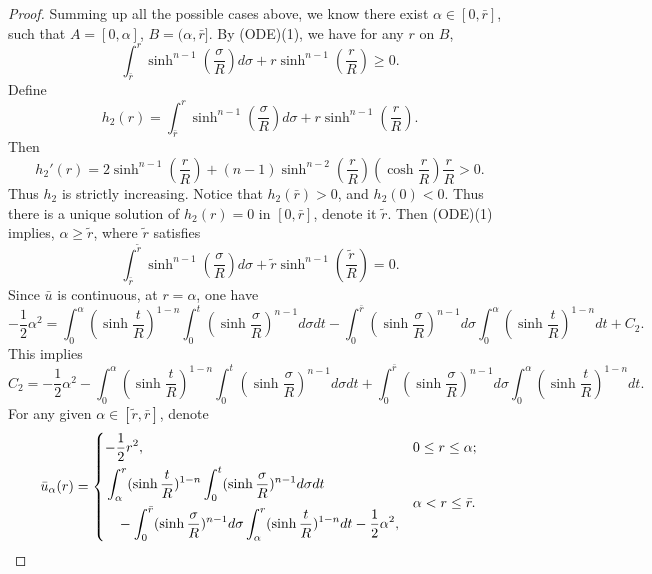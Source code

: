 \begin{proof}
	Summing up all the possible cases above, we know there exist $\alpha \in [0, \bar{r}]$, such that $A=[0,\alpha]$, $B=(\alpha, \bar{r}]$. By (ODE)(1), we have for any $r$ on $B$, 
	$$\int_{\bar{r}}^{r}\sinh^{n-1}\left(\frac{\sigma}{R}\right) d\sigma +r\sinh^{n-1}\left(\frac{r}{R}\right)\ge 0.$$ 
	Define 
	$$ h_2(r)=\int_{\bar{r}}^{r}\sinh^{n-1}\left(\frac{\sigma}{R}\right) d\sigma +r\sinh^{n-1}\left(\frac{r}{R}\right).$$ 
	Then $$h_2'(r) = 2\sinh^{n-1}\left(\frac{r}{R}\right) +(n-1)\sinh^{n-2}\left(\frac{r}{R}\right)\left(\cosh\frac{r}{R}\right)\frac{r}{R}>0.$$
	Thus $h_2$ is strictly increasing. Notice that $h_2(\bar{r})>0$, and $h_2(0)<0$. Thus there is a unique solution of $h_2(r)=0$ in $[0, \bar{r}]$, denote it $\tilde{r}$. Then (ODE)(1) implies, $\alpha\ge \tilde{r}$, where $\tilde{r}$ satisfies
	\begin{equation}
	\int_{\bar{r}}^{\tilde{r}}\sinh^{n-1}\left(\frac{\sigma}{R}\right) d\sigma +\tilde{r}\sinh^{n-1}\left(\frac{\tilde{r}}{R}\right)=0.
	\end{equation}
	Since $\bar{u}$ is continuous, at $r=\alpha$, one have 
	\begin{equation*}
	-\frac{1}{2} \alpha^2 = \int_{0}^{\alpha}\left(\sinh\frac{t}{R}\right)^{1-n} \int_{0}^{t} \left(\sinh\frac{\sigma }{R}\right)^{n-1} d\sigma  dt  -\int_{0}^{\bar{r}} \left(\sinh\frac{\sigma }{R}\right)^{n-1} d\sigma \int_{0}^{\alpha}\left(\sinh\frac{t}{R}\right)^{1-n} dt +C_2.
	\end{equation*}
	This implies 
	\begin{equation*}
	C_2=-\frac{1}{2} \alpha^2 - \int_{0}^{\alpha}\left(\sinh\frac{t}{R}\right)^{1-n} \int_{0}^{t} \left(\sinh\frac{\sigma }{R}\right)^{n-1} d\sigma  dt  +\int_{0}^{\bar{r}} \left(\sinh\frac{\sigma }{R}\right)^{n-1} d\sigma \int_{0}^{\alpha}\left(\sinh\frac{t}{R}\right)^{1-n} dt.
	\end{equation*}
	For any given $\alpha \in [\tilde{r},\bar{r}]$, denote 
	\begin{equation*}
	\bar{u}_{\alpha}(r) =
	\begin{dcases}
	-\frac{1}{2} r^2, &0\le r\le \alpha;\\
	\begin{split}
	&\int_{\alpha}^{r}(\sinh\frac{t}{R})^{1-n} \int_{0}^{t} (\sinh\frac{\sigma }{R})^{n-1} d\sigma  dt \\
	&\hspace{0.3cm}-\int_{0}^{\bar{r}} (\sinh\frac{\sigma }{R})^{n-1} d\sigma\int_{\alpha}^{r}(\sinh\frac{t}{R})^{1-n} dt -\frac{1}{2} \alpha^2 ,
	\end{split} & \alpha <r\le \bar{r}.
	\end{dcases}
	\end{equation*}
	

\end{proof}
